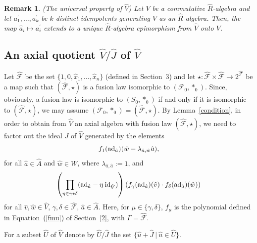 \documentclass[a4paper]{amsart}
\newtheorem{remark}[lemma]{Remark}
\newcommand{\A}{ {\hat A}}
\newcommand{\So}{{\hat {\mathcal F}}}
\newcommand{\ad}{{\rm ad}}
\newcommand{\aV}{{\hat V}}
\newcommand{\hJ}{{\hat J}}
\newcommand{\ha}{{\hat a}}
\newcommand{\hw}{{\hat w}}
\newcommand{\hv}{{\hat v}}
\newcommand{\hu}{{\hat u}}
\begin{document}
\begin{remark}\label{uniV}{ \sc (The universal property of $\hat V$)} 
Let $V$ be a commutative $\hat R$-algebra and let $a_1^\prime, \ldots , a_k^\prime$ be $k$ distinct idempotents generating $V$ as an $\hat R$-algebra. Then, the map $\hat a_i\mapsto a_i^\prime$ extends to a unique $\hat R$-algebra epimorphism  from $\hat V$ onto $V$.
\end{remark}

\subsection{An axial quotient $\aV/\hJ$ of $\aV$}

Let $\So$ be the set $\{1,0, \hat x_1,\ldots, \hat x_n\}$ (defined in Section~3) and let $\star\colon  \So \times \So \to 2^{\So}$ be a map such that $(\So,\star)$ is a fusion law isomorphic to $(\mathcal F_0, \ast_0)$. Since, obviously, a fusion law is isomorphic to $(S_0,\ast_0)$ if and only if it is isomorphic to $(\So,\star)$, we may assume $(\mathcal F_0, \ast_0)= (\So,\star)$. By Lemma~\ref{condition}, in order to obtain from $\hat V$ an axial algebra with fusion law $(\So,\star)$, we need to factor out the ideal $J$ of $\hat V$ generated by the elements 
\begin{equation}\label{auto}
f_1(\ad_\ha)(\hw-\lambda_{\ha,\hw}\ha), 
\end{equation}
for all  $\ha\in \A $ and $\hw\in W$, where  $\lambda_{\ha,\ha}:=1$, and 
\begin{equation}\label{fusion}
\left (\prod_{\eta \in \gamma\star \delta}(\ad_\ha-\eta \:{\rm id}_\aV)\right )\left (f_\gamma(\ad_\ha)( \hv) \cdot f_\delta(\ad_\ha) (\hw)\right )
\end{equation}
for all $ \hv, \hw\in  \aV$, $\gamma, \delta\in \So$, $\ha\in \A$. Here, for $\mu\in \{\gamma, \delta\}$, $f_\mu$ is the polynomial  defined in Equation~(\ref{fmu}) of Section~\ref{2}, with $\Gamma=\hat{\mathcal F}$. 

For a subset $\hat U$ of $\hat V$ denote by $\hat U/\hJ$ the set $\{\hu+\hJ\:|\:\hu\in \hat U\}$. 
\end{document}
